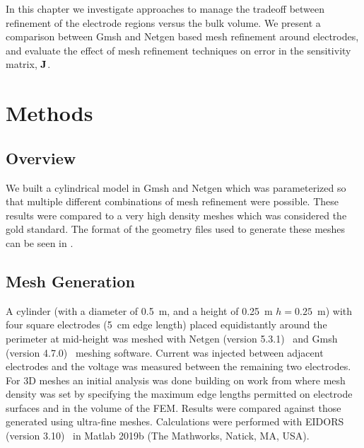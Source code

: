 In this chapter we investigate approaches to manage the tradeoff
between refinement of the electrode regions versus the bulk volume. 
We present a comparison between Gmsh and 
Netgen based mesh refinement around electrodes, and evaluate the 
effect of mesh refinement techniques on error in  the sensitivity matrix, 
$\bf J$. 

\section{Methods}
\subsection{Overview}

We built a cylindrical model in Gmsh and Netgen which was parameterized so that multiple
different combinations of mesh refinement were possible.
These results were compared to a very high density meshes which was considered the gold standard.
The format of the geometry files used to generate these meshes can be seen in .

\subsection{Mesh Generation}
A cylinder (with a diameter of 0.5~m, and a height of 0.25~m $h=0.25$~m) with four square electrodes 
(5~cm edge length) placed equidistantly around the perimeter at mid-height was
meshed with Netgen (version 5.3.1)~\parencite{schoberl_netgen_1997} and Gmsh 
(version 4.7.0)~\parencite{geuzaine_gmsh_2009}
meshing software.
Current was injected between adjacent electrodes and the voltage was measured between the remaining
two electrodes.
For 3D meshes an initial analysis was done building on work from
 where mesh density was
set by specifying the maximum edge lengths permitted on electrode surfaces
and in the volume of the FEM.
Results were compared against those generated using ultra-fine meshes. 
Calculations were performed with EIDORS (version 3.10)~\parencite{adler_uses_2006} 
in Matlab 2019b
(The Mathworks, Natick, MA, USA).


